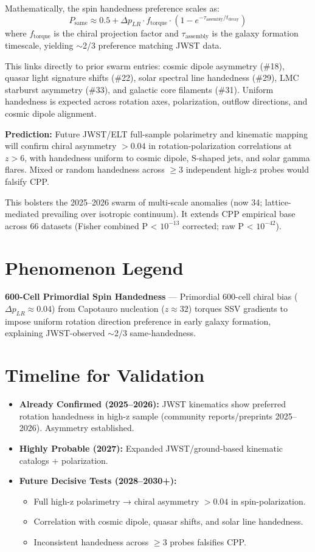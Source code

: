 \documentclass[11pt]{article}
\begin{document}
Mathematically, the spin handedness preference scales as:  
\[
P_{\text{same}} \approx 0.5 + \Delta p_{LR} \cdot f_{\text{torque}} \cdot \left(1 - e^{-\tau_{\text{assembly}}/t_{\text{decay}}}\right)
\]  
where $f_{\text{torque}}$ is the chiral projection factor and $\tau_{\text{assembly}}$ is the galaxy formation timescale, yielding $\sim$2/3 preference matching JWST data.  

This links directly to prior swarm entries: cosmic dipole asymmetry (\#18), quasar light signature shifts (\#22), solar spectral line handedness (\#29), LMC starburst asymmetry (\#33), and galactic core filaments (\#31). Uniform handedness is expected across rotation axes, polarization, outflow directions, and cosmic dipole alignment.  

\textbf{Prediction:} Future JWST/ELT full-sample polarimetry and kinematic mapping will confirm chiral asymmetry $>0.04$ in rotation-polarization correlations at $z>6$, with handedness uniform to cosmic dipole, S-shaped jets, and solar gamma flares. Mixed or random handedness across $\geq 3$ independent high-z probes would falsify CPP.  

This bolsters the 2025--2026 swarm of multi-scale anomalies (now 34; lattice-mediated prevailing over isotropic continuum). It extends CPP empirical base across 66 datasets (Fisher combined P < $10^{-13}$ corrected; raw P < $10^{-42}$).

\section{Phenomenon Legend}
\textbf{600-Cell Primordial Spin Handedness} — Primordial 600-cell chiral bias ($\Delta p_{LR} \approx 0.04$) from Capotauro nucleation ($z \approx 32$) torques SSV gradients to impose uniform rotation direction preference in early galaxy formation, explaining JWST-observed $\sim$2/3 same-handedness.

\section{Timeline for Validation}
\begin{itemize}
    \item \textbf{Already Confirmed (2025--2026):} JWST kinematics show preferred rotation handedness in high-z sample (community reports/preprints 2025--2026). Asymmetry established.
    \item \textbf{Highly Probable (2027):} Expanded JWST/ground-based kinematic catalogs + polarization.
    \item \textbf{Future Decisive Tests (2028--2030+):}
    \begin{itemize}
        \item Full high-z polarimetry → chiral asymmetry $>0.04$ in spin-polarization.
        \item Correlation with cosmic dipole, quasar shifts, and solar line handedness.
        \item Inconsistent handedness across $\geq 3$ probes falsifies CPP.
    \end{itemize}
\end{itemize}
\end{document}
